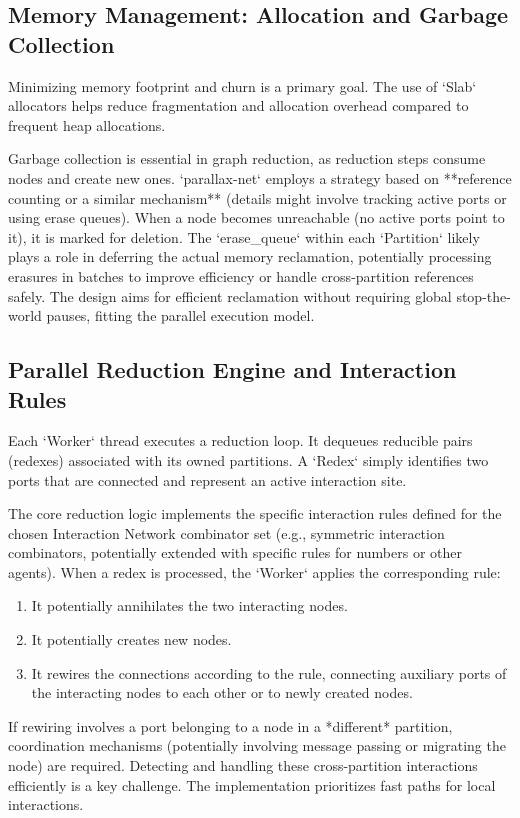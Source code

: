 \subsection{Memory Management: Allocation and Garbage Collection} %
Minimizing memory footprint and churn is a primary goal. The use of `Slab` allocators helps reduce fragmentation and allocation overhead compared to frequent heap allocations.

Garbage collection is essential in graph reduction, as reduction steps consume nodes and create new ones. `parallax-net` employs a strategy based on **reference counting or a similar mechanism** (details might involve tracking active ports or using erase queues). When a node becomes unreachable (no active ports point to it), it is marked for deletion. The `erase_queue` within each `Partition` likely plays a role in deferring the actual memory reclamation, potentially processing erasures in batches to improve efficiency or handle cross-partition references safely. The design aims for efficient reclamation without requiring global stop-the-world pauses, fitting the parallel execution model.

\subsection{Parallel Reduction Engine and Interaction Rules} %
Each `Worker` thread executes a reduction loop. It dequeues reducible pairs (redexes) associated with its owned partitions. A `Redex` simply identifies two ports that are connected and represent an active interaction site.

The core reduction logic implements the specific interaction rules defined for the chosen Interaction Network combinator set (e.g., symmetric interaction combinators, potentially extended with specific rules for numbers or other agents). When a redex is processed, the `Worker` applies the corresponding rule:
\begin{enumerate}
    \item It potentially annihilates the two interacting nodes.
    \item It potentially creates new nodes.
    \item It rewires the connections according to the rule, connecting auxiliary ports of the interacting nodes to each other or to newly created nodes.
\end{enumerate}
If rewiring involves a port belonging to a node in a *different* partition, coordination mechanisms (potentially involving message passing or migrating the node) are required. Detecting and handling these cross-partition interactions efficiently is a key challenge. The implementation prioritizes fast paths for local interactions.

